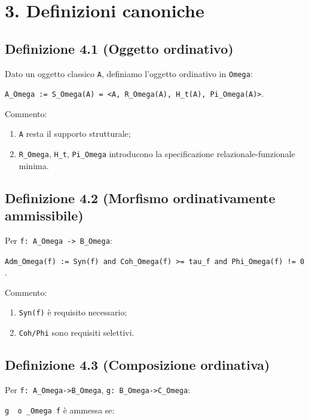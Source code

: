 \section{3. Definizioni canoniche}

\subsection{Definizione 4.1 (Oggetto ordinativo)}

Dato un oggetto classico \texttt{A}, definiamo l'oggetto ordinativo in \texttt{Omega}:

\texttt{A\_Omega\ :=\ S\_Omega(A)\ =\ \textless{}A,\ R\_Omega(A),\ H\_t(A),\ Pi\_Omega(A)\textgreater{}}.

Commento:

\begin{enumerate}
\def\labelenumi{\arabic{enumi}.}
\tightlist
\item
  \texttt{A} resta il supporto strutturale;
\item
  \texttt{R\_Omega}, \texttt{H\_t}, \texttt{Pi\_Omega} introducono la specificazione relazionale-funzionale minima.
\end{enumerate}

\subsection{Definizione 4.2 (Morfismo ordinativamente ammissibile)}

Per \texttt{f:\ A\_Omega\ -\textgreater{}\ B\_Omega}:

\texttt{Adm\_Omega(f)\ :=\ Syn(f)\ and\ Coh\_Omega(f)\ \textgreater{}=\ tau\_f\ and\ Phi\_Omega(f)\ !=\ 0}.

Commento:

\begin{enumerate}
\def\labelenumi{\arabic{enumi}.}
\tightlist
\item
  \texttt{Syn(f)} è requisito necessario;
\item
  \texttt{Coh/Phi} sono requisiti selettivi.
\end{enumerate}

\subsection{Definizione 4.3 (Composizione ordinativa)}

Per \texttt{f:\ A\_Omega-\textgreater{}B\_Omega}, \texttt{g:\ B\_Omega-\textgreater{}C\_Omega}:

\texttt{g\ \ o\ \_Omega\ f} è ammessa se:

